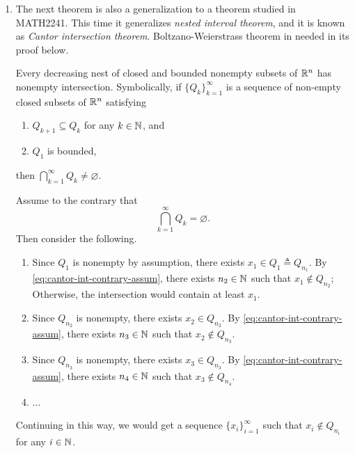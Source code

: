 \begin{enumerate}
\item The next theorem is also a generalization to a theorem studied in
MATH2241. This time it generalizes \emph{nested interval theorem}, and it is
known as \emph{Cantor intersection theorem}. Boltzano-Weierstrass theorem in
needed in its proof below.
\begin{theorem}
\label{thm:cantor-intersection}
Every decreasing nest of closed and bounded nonempty subsets of \(\mathbb{R}^n\) has
nonempty intersection. Symbolically, if \(\{Q_k\}_{k=1}^{\infty}\) is a
sequence of non-empty closed subsets of \(\mathbb{R}^n\) satisfying
\begin{enumerate}
\item \(Q_{k+1}\subseteq Q_k\) for any \(k\in\mathbb{N}\), and
\item \(Q_1\) is bounded,
\end{enumerate}
then \(\displaystyle \bigcap_{k=1}^{\infty}Q_k\ne\varnothing\).
\end{theorem}
\begin{pf}
Assume to the contrary that 
\begin{equation}
\label{eq:cantor-int-contrary-assum}
\bigcap_{k=1}^{\infty}Q_k=\varnothing.
\end{equation}
Then consider the following.
\begin{enumerate}
\item Since \(Q_1\) is nonempty by assumption, there exists \(x_1\in Q_1\triangleq Q_{n_1}\). By
\cref{eq:cantor-int-contrary-assum}, there exists \(n_2\in\mathbb{N}\) such that \(x_1\notin
Q_{n_2}\); Otherwise, the intersection would contain at least \(x_1\).
\item Since \(Q_{n_2}\) is nonempty, there exists \(x_2\in Q_{n_2}\).
By \cref{eq:cantor-int-contrary-assum}, there exists \(n_3\in\mathbb{N}\) such that
\(x_2\notin Q_{n_3}\).
\item Since \(Q_{n_3}\) is nonempty, there exists \(x_3\in Q_{n_3}\).
By \cref{eq:cantor-int-contrary-assum}, there exists \(n_4\in\mathbb{N}\) such that
\(x_3\notin Q_{n_4}\).
\item ...
\end{enumerate}
Continuing in this way, we would get a sequence \(\{x_i\}_{i=1}^{\infty}\) such
that \(x_i\notin Q_{n_i}\) for any \(i\in\mathbb{N}\).
\begin{center}
\end{center}
\end{pf}
\end{enumerate}
